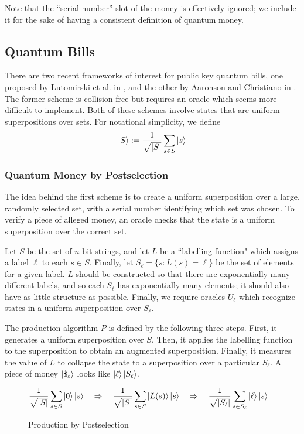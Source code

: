 \documentclass[12pt]{article}
\begin{document}
Note that the ``serial number'' slot of the money is effectively ignored; we include it for the sake of having a consistent definition of quantum money.

\subsection{Quantum Bills}
There are two recent frameworks of interest for public key quantum bills, one proposed by Lutomirski et al. in \cite{Lut09}, and the other by Aaronson and Christiano in \cite{Aar13}.  The former scheme is collision-free but requires an oracle which seems more difficult to implement.  Both of these schemes involve states that are uniform superpositions over sets.  For notational simplicity, we define $$\Ket{S} := \frac{1}{\sqrt{|S|}} \sum_{s \in S} \Ket{s}$$

\subsubsection{Quantum Money by Postselection}
The idea behind the first scheme is to create a uniform superposition over a large, randomly selected set, with a serial number identifying which set was chosen.  To verify a piece of alleged money, an oracle checks that the state is a uniform superposition over the correct set.

Let $S$ be the set of $n$-bit strings, and let $L$ be a ``labelling function" which assigns a label $\ell$ to each $s \in S$.  Finally, let ${S_\ell} = \{s : L(s) = \ell\}$ be the set of elements for a given label.  $L$ should be constructed so that there are exponentially many different labels, and so each $S_\ell$ has exponentially many elements; it should also have as little structure as possible.  Finally, we require oracles $U_\ell$ which recognize states in a uniform superposition over $S_\ell$.

The production algorithm $P$ is defined by the following three steps.  First, it generates a uniform superposition over $S$.  Then, it applies the labelling function to the superposition to obtain an augmented superposition.  Finally, it measures the value of $L$ to collapse the state to a superposition over a particular $S_\ell$.  A piece of money $\Ket{\$_\ell}$ looks like $\Ket{\ell}\Ket{S_\ell}$.

\begin{figure}[h!]
\caption{Production by Postselection}
\centering
$\displaystyle
\frac{1}{\sqrt{|S|}} \sum_{s \in S} \Ket{0}\Ket{s} \quad
\Rightarrow \quad
\frac{1}{\sqrt{|S|}} \sum_{s \in S} \Ket{L(s)}\Ket{s} \quad
\Rightarrow \quad
\frac{1}{\sqrt{|S_\ell|}} \sum_{s \in S_\ell} \Ket{\ell}\Ket{s}
$
\end{figure}
\end{document}

